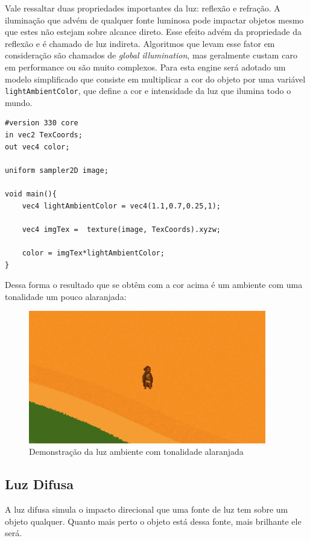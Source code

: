 \documentclass[12pt, 
openright, 
oneside, 
a4paper,    
brazil]{facom-ufu-abntex2}
\begin{document}
Vale ressaltar duas propriedades importantes da luz: reflexão e refração. A iluminação que advém de qualquer fonte luminosa pode impactar objetos mesmo que estes não estejam sobre alcance direto. Esse efeito advém da propriedade da reflexão e é chamado de luz indireta. Algoritmos que levam esse fator em consideração são chamados de \textit{global illumination}, mas geralmente custam caro em performance ou são muito complexos.
Para esta engine será adotado um modelo simplificado que consiste em multiplicar a cor do objeto por uma variável \texttt{lightAmbientColor}, que define a cor e intensidade da luz que ilumina todo o mundo.

\begin{lstlisting}[caption=Fragment Shader com luz ambiente]
#version 330 core
in vec2 TexCoords;
out vec4 color;

uniform sampler2D image;

void main(){
	vec4 lightAmbientColor = vec4(1.1,0.7,0.25,1);
	
	vec4 imgTex =  texture(image, TexCoords).xyzw;
	
	color = imgTex*lightAmbientColor;
}
\end{lstlisting}

Dessa forma o resultado que se obtêm com a cor acima é um ambiente com uma tonalidade um pouco alaranjada:

\begin{figure}[H]
	\centering
	\includegraphics[width=28em]{imagens/sunset.png}
	\caption{Demonstração da luz ambiente com tonalidade alaranjada}
\end{figure}


\subsection{Luz Difusa}
A luz difusa simula o impacto direcional que uma fonte de luz tem sobre um objeto qualquer. Quanto mais perto o objeto está dessa fonte, mais brilhante ele será.
\end{document}
